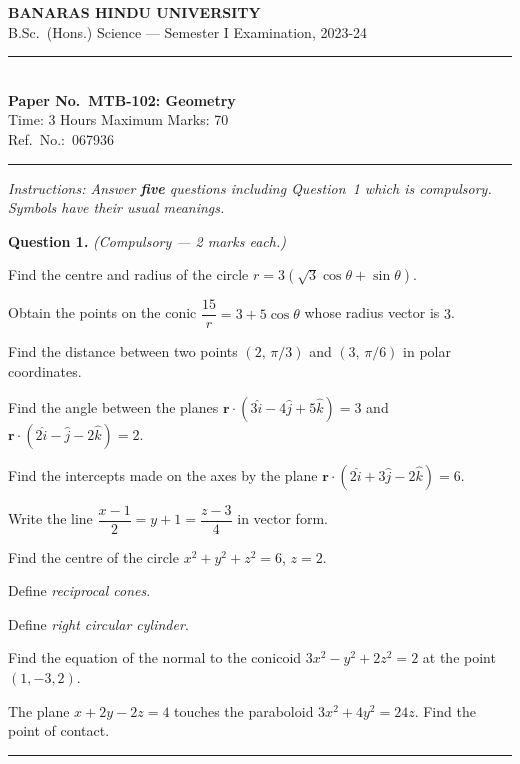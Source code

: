 \documentclass[11pt,a4paper]{article}
\begin{document}
\begin{center}
  {\large\bfseries BANARAS HINDU UNIVERSITY}\\[2pt]
  {\normalsize B.Sc.\ (Hons.) Science --- Semester I Examination, 2023-24}\\[6pt]
  \rule{0.8\linewidth}{0.5pt}\\[6pt]
  {\large\bfseries Paper No.\ MTB-102: Geometry}\\[4pt]
  {\normalsize Time: 3 Hours \hfill Maximum Marks: 70}\\[2pt]
  {\small Ref.\ No.:\ 067936}
\end{center}
\rule{\linewidth}{0.4pt}
\smallskip



\noindent   \textit{Instructions: Answer   \textbf{five} questions including Question~1 which is compulsory. Symbols have their usual meanings.}
\bigskip




\noindent   \textbf{Question 1.}   \textit{(Compulsory --- 2 marks each.)}

\begin{parts}
  \item Find the centre and radius of the circle $r = 3(\sqrt{3}\cos \theta + \sin \theta)$.
  \item Obtain the points on the conic $\dfrac{15}{r} = 3 + 5\cos \theta$ whose radius vector is $3$.
  \item Find the distance between two points $(2,\,\pi/3)$ and $(3,\,\pi/6)$ in polar coordinates.
  \item Find the angle between the planes $\mathbf{r}\cdot(3\hat{i}-4\hat{j}+5\hat{k})=3$ and $\mathbf{r}\cdot(2\hat{i}-\hat{j}-2\hat{k})=2$.
  \item Find the intercepts made on the axes by the plane $\mathbf{r}\cdot(2\hat{i}+3\hat{j}-2\hat{k})=6$.
  \item Write the line $\dfrac{x-1}{2}=y+1=\dfrac{z-3}{4}$ in vector form.
  \item Find the centre of the circle $x^2+y^2+z^2=6$, $z=2$.
  \item Define \emph{reciprocal cones}.
  \item Define \emph{right circular cylinder}.
  \item Find the equation of the normal to the conicoid $3x^2-y^2+2z^2=2$ at the point $(1,-3,2)$.
  \item The plane $x+2y-2z=4$ touches the paraboloid $3x^2+4y^2=24z$. Find the point of contact.
\end{parts}
\medskip\rule{\linewidth}{0.2pt}
\end{document}
